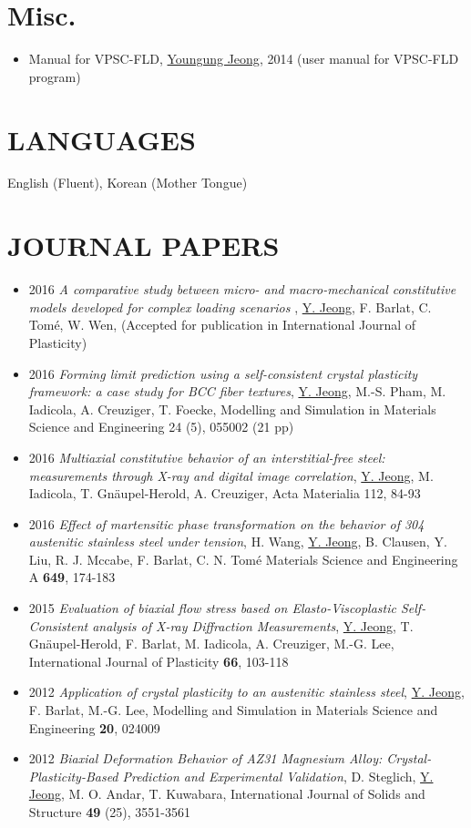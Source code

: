 \documentclass{res}
\begin{document}
\begin{resume}
  \section{Misc.}
  \begin{itemize}
  \item Manual for VPSC-FLD, \underline{Youngung Jeong}, 2014 (user manual for VPSC-FLD program)
  \end{itemize}

  \section{LANGUAGES}
  English (Fluent), Korean (Mother Tongue)

  \section{JOURNAL PAPERS}
  \begin{itemize}
  \item 2016 {\it A comparative study between micro- and macro-mechanical constitutive models developed for complex loading scenarios} , \underline{Y. Jeong}, F. Barlat, C. Tom\'{e}, W. Wen, (Accepted for publication in International Journal of Plasticity)
  \item 2016 {\it Forming limit prediction using a self-consistent crystal plasticity framework: a case study for BCC fiber textures}, \underline{Y. Jeong}, M.-S. Pham, M. Iadicola, A. Creuziger, T. Foecke, Modelling and Simulation in Materials Science and Engineering 24 (5), 055002 (21 pp)
  \item 2016 {\it Multiaxial constitutive behavior of an interstitial-free steel: measurements through X-ray and digital image correlation}, \underline{Y. Jeong}, M. Iadicola, T. Gn\"{a}upel-Herold, A. Creuziger, Acta Materialia 112, 84-93
  \item 2016 {\it Effect of martensitic phase transformation on the behavior of 304 austenitic stainless steel under tension}, H. Wang, \underline{Y. Jeong}, B. Clausen, Y. Liu, R. J. Mccabe, F. Barlat, C. N. Tom\'{e} Materials Science and Engineering A {\bf 649}, 174-183
  \item 2015 {\it Evaluation of biaxial flow stress based on Elasto-Viscoplastic Self-Consistent analysis of X-ray Diffraction Measurements}, \underline{Y. Jeong}, T. Gn\"{a}upel-Herold, F. Barlat, M. Iadicola, A. Creuziger, M.-G. Lee, International Journal of Plasticity {\bf 66}, 103-118
  \item 2012 {\it Application of crystal plasticity to an austenitic stainless steel}, \underline{Y. Jeong}, F. Barlat, M.-G. Lee, Modelling and Simulation in Materials Science and Engineering {\bf 20}, 024009
  \item 2012 {\it Biaxial Deformation Behavior of AZ31 Magnesium Alloy: Crystal-Plasticity-Based Prediction and Experimental Validation}, D. Steglich, \underline{Y. Jeong}, M. O. Andar, T. Kuwabara, International Journal of Solids and Structure {\bf 49} (25), 3551-3561
  \end{itemize}


\end{resume}
\end{document}
